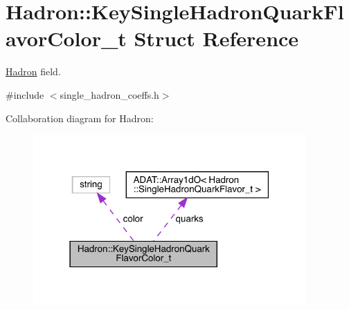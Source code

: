 \hypertarget{structHadron_1_1KeySingleHadronQuarkFlavorColor__t}{}\section{Hadron\+:\+:Key\+Single\+Hadron\+Quark\+Flavor\+Color\+\_\+t Struct Reference}
\label{structHadron_1_1KeySingleHadronQuarkFlavorColor__t}


\mbox{\hyperlink{namespaceHadron}{Hadron}} field.  




{\ttfamily \#include $<$single\+\_\+hadron\+\_\+coeffs.\+h$>$}



Collaboration diagram for Hadron\+:\nopagebreak
\begin{figure}[H]
\begin{center}
\leavevmode
\includegraphics[width=295pt]{dd/db9/structHadron_1_1KeySingleHadronQuarkFlavorColor__t__coll__graph}
\end{center}
\end{figure}
